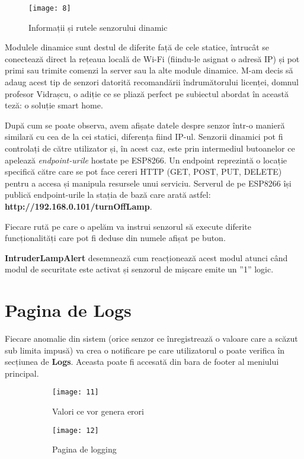 \begin{wrapfigure}{r}{0.3\textwidth}
	\texttt{[image: 8]}
	\caption{Informații și rutele senzorului dinamic}
	\label{fig:8}
\end{wrapfigure}

Modulele dinamice sunt destul de diferite față de cele statice, întrucât se conectează direct la rețeaua locală de Wi-Fi (fiindu-le asignat o adresă IP) și pot primi sau trimite comenzi la server sau la alte module dinamice. M-am decis să adaug acest tip de senzori datorită recomandării îndrumătorului licenței, domnul profesor Vidrașcu, o adiție ce se pliază perfect pe subiectul abordat în această teză: o soluție smart home.

După cum se poate observa, avem afișate datele despre senzor într-o manieră similară cu cea de la cei statici, diferența fiind IP-ul. Senzorii dinamici pot fi controlați de către utilizator și, în acest caz, este prin intermediul butoanelor ce apelează \emph{endpoint-urile} hostate pe ESP8266. Un endpoint reprezintă o locație specifică către care se pot face cereri HTTP (GET, POST, PUT, DELETE) pentru a accesa și manipula resursele unui serviciu. Serverul de pe ESP8266 își publică endpoint-urile la stația de bază care arată astfel: \textbf{http://192.168.0.101/turnOffLamp}.

Fiecare rută pe care o apelăm va instrui senzorul să execute diferite funcționalități care pot fi deduse din numele afișat pe buton.

\textbf{IntruderLampAlert} desemnează cum reacționează acest modul atunci când modul de securitate este activat și senzorul de mișcare emite un ”1” logic.

\section{Pagina de Logs}

Fiecare anomalie din sistem (orice senzor ce înregistrează o valoare care a scăzut sub limita impusă) va crea o notificare pe care utilizatorul o poate verifica în secțiunea de \textbf{Logs}. Aceasta poate fi accesată din bara de footer al meniului principal.

\begin{figure}[h]
	\centering
	\begin{subfigure}{0.45\textwidth}
		\texttt{[image: 11]}
		\caption{Valori ce vor genera erori}
		\label{fig:11}
	\end{subfigure}
	\hfill
	\begin{subfigure}{0.35\textwidth}
		\texttt{[image: 12]}
		\caption{Pagina de logging}
		\label{fig:12}
	\end{subfigure}
	\caption{}
	\label{fig:all5}
\end{figure}


